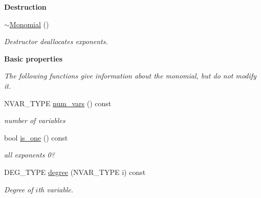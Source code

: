 \begin{Indent}\textbf{ Destruction}\par
\begin{DoxyCompactItemize}
\item 
\mbox{\label{class_monomial_a7c56cfe0292638732d60169d960f877c}} 
\hyperlink{class_monomial_a7c56cfe0292638732d60169d960f877c}{$\sim$\+Monomial} ()
\begin{DoxyCompactList}\small\item\em Destructor deallocates exponents. \end{DoxyCompactList}\end{DoxyCompactItemize}
\end{Indent}
\begin{Indent}\textbf{ Basic properties}\par
{\em The following functions give information about the monomial, but do not modify it. }\begin{DoxyCompactItemize}
\item 
\mbox{\label{class_monomial_a4ade87fb2cae33669c66c7b23819ba57}} 
N\+V\+A\+R\+\_\+\+T\+Y\+PE \hyperlink{class_monomial_a4ade87fb2cae33669c66c7b23819ba57}{num\+\_\+vars} () const
\begin{DoxyCompactList}\small\item\em number of variables \end{DoxyCompactList}\item 
\mbox{\label{class_monomial_aa1508ad890693aee2f5c35e156f12e83}} 
bool \hyperlink{class_monomial_aa1508ad890693aee2f5c35e156f12e83}{is\+\_\+one} () const
\begin{DoxyCompactList}\small\item\em all exponents 0? \end{DoxyCompactList}\item 
\mbox{\label{class_monomial_a817508c95fe721c56c78d91975b8416b}} 
D\+E\+G\+\_\+\+T\+Y\+PE \hyperlink{class_monomial_a817508c95fe721c56c78d91975b8416b}{degree} (N\+V\+A\+R\+\_\+\+T\+Y\+PE i) const
\begin{DoxyCompactList}\small\item\em Degree of $i$th variable. \end{DoxyCompactList}\item 
\mbox{\label{class_monomial_ab3c18ba0fe7442e07d630bddea3469b5}} 

\end{DoxyCompactItemize}
\end{Indent}
